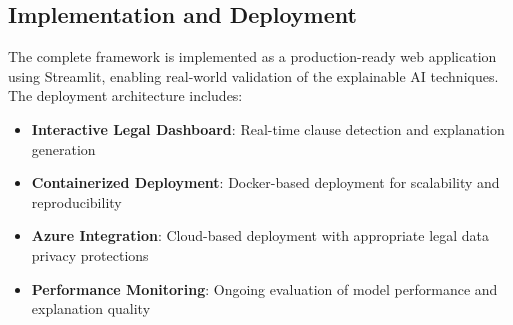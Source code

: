 \subsection{Implementation and Deployment}

The complete framework is implemented as a production-ready web application using Streamlit, enabling real-world validation of the explainable AI techniques. The deployment architecture includes:

\begin{itemize}
    \item \textbf{Interactive Legal Dashboard}: Real-time clause detection and explanation generation
    \item \textbf{Containerized Deployment}: Docker-based deployment for scalability and reproducibility
    \item \textbf{Azure Integration}: Cloud-based deployment with appropriate legal data privacy protections
    \item \textbf{Performance Monitoring}: Ongoing evaluation of model performance and explanation quality
\end{itemize}